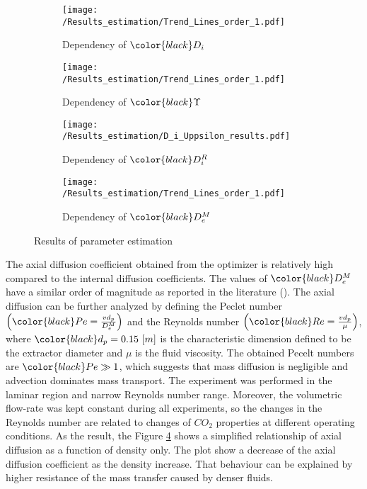 \documentclass[../Article_Model_Parameters.tex]{subfiles}
\begin{document}
		\begin{figure}[!h]
		\centering
		\begin{subfigure}[b]{0.49\columnwidth}
			\centering
			\texttt{[image: /Results\_estimation/Trend\_Lines\_order\_1.pdf]}
			\caption{Dependency of ${\color{black}D_i}$}
			\label{fig: results_DI}
		\end{subfigure}
		\begin{subfigure}[b]{0.49\columnwidth}
			\centering
			\texttt{[image: /Results\_estimation/Trend\_Lines\_order\_1.pdf]}
			\caption{Dependency of ${\color{black}\Upsilon}$}
			\label{fig: results_upsilon}
		\end{subfigure}
		\hfill
		\begin{subfigure}[b]{0.49\columnwidth}
			\texttt{[image: /Results\_estimation/D\_i\_Uppsilon\_results.pdf]}
			\caption{Dependency of ${\color{black}D^R_i}$}
			\label{fig:Di_upsilon_res}
		\end{subfigure}
		\begin{subfigure}[b]{0.49\columnwidth}
			\centering
			\texttt{[image: /Results\_estimation/Trend\_Lines\_order\_1.pdf]}
			\caption{Dependency of ${\color{black}D^M_e}$}
			\label{fig: results_De}
		\end{subfigure}
		\caption{Results of parameter estimation}
		\label{fig: estimation_results_DI_GAMMA}
	\end{figure}
	
	The axial diffusion coefficient obtained from the optimizer is relatively high compared to the internal diffusion coefficients. The values of ${\color{black}D_e^M}$ have a similar order of magnitude as reported in the literature (\citet{ReisVasco2000}).
	The axial diffusion can be further analyzed by defining the Peclet number $\left( {\color{black}Pe} = \frac{v d_p}{D_e^M} \right)$ and the Reynolds number $\left( {\color{black}Re} = \frac{v d_p}{\mu} \right)$, where ${\color{black}d_p}=0.15~[m]$ is the characteristic dimension defined to be the extractor diameter and $\mu$ is the fluid viscosity.
	The obtained Pecelt numbers are ${\color{black}Pe} \gg 1$, which suggests that mass diffusion is negligible and advection dominates mass transport. The experiment was performed in the laminar region and narrow Reynolds number range. Moreover, the volumetric flow-rate was kept constant during all experiments, so the changes in the Reynolds number are related to changes of $CO_2$ properties at different operating conditions. As the result, the Figure \ref{fig: results_De} shows a simplified relationship of axial diffusion as a function of density only. The plot show a decrease of the axial diffusion coefficient as the density increase. That behaviour can be explained by higher resistance of the mass transfer caused by denser fluids.
	
\end{document}
